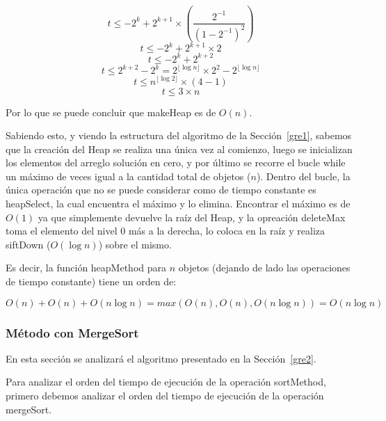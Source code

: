 \documentclass[a4paper,10pt,spanish]{article}
\begin{document}
\begin{equation}
 t \le - 2^k + 2^{k+1} \times ( \frac{2^{-1}}{( 1 - 2^{-1} )^2} )
\end{equation}
\begin{equation}
 t \le - 2^k + 2^{k+1} \times 2
\end{equation}
\begin{equation}
 t \le - 2^k + 2^{k+2}
\end{equation}
\begin{equation}
 t \le 2^{k+2} - 2^k = 2^{\lfloor \log n \rfloor} \times 2^2 - 2^{\lfloor \log n \rfloor}
\end{equation}
\begin{equation}
 t \le n^{\lfloor \log 2 \rfloor} \times ( 4 - 1 )
\end{equation}
\begin{equation}
 t \le 3 \times n
\end{equation}

Por lo que se puede concluir que makeHeap es de $O(n)$.

Sabiendo esto, y viendo la estructura del algoritmo de la Secci\'on~\ref{gre1}, sabemos que la creaci\'on del Heap se realiza una \'unica vez al comienzo, luego se inicializan los elementos del arreglo soluci\'on en cero, y por \'ultimo se recorre el bucle while un m\'aximo de veces igual a la cantidad total de objetos ($n$). Dentro del bucle, la \'unica operaci\'on que no se puede considerar como de tiempo constante es heapSelect, la cual encuentra el m\'aximo y lo elimina. Encontrar el m\'aximo es de $O(1)$ ya que simplemente devuelve la ra\'iz del Heap, y la opreaci\'on deleteMax toma el elemento del nivel 0 m\'as a la derecha, lo coloca en la ra\'iz y realiza siftDown ($O(\log n)$) sobre el mismo.

Es decir, la funci\'on heapMethod para $n$ objetos (dejando de lado las operaciones de tiempo constante) tiene un orden de:

$O(n) + O(n) + O(n\log n) = max(O(n), O(n), O(n\log n)) = O(n\log n)$

	\subsubsection{M\'etodo con MergeSort}
	En esta secci\'on se analizar\'a el algoritmo presentado en la Secci\'on~\ref{gre2}.
	
	\vspace{4mm}
	Para analizar el orden del tiempo de ejecuci\'on de la operaci\'on sortMethod, primero debemos analizar el orden del tiempo de ejecuci\'on de la operaci\'on mergeSort.
	
\end{document}
